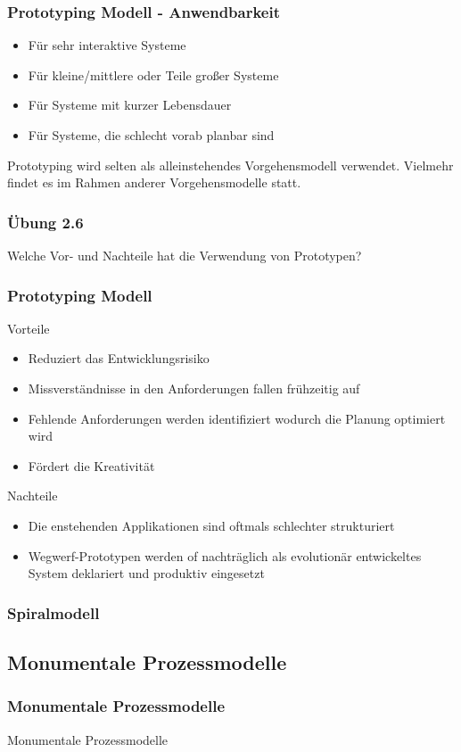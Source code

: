 \begin{frame}
\frametitle{Prototyping Modell - Anwendbarkeit}
	\begin{itemize}
		\item Für sehr interaktive Systeme
		\item Für kleine/mittlere oder Teile großer Systeme
		\item Für Systeme mit kurzer Lebensdauer
		\item Für Systeme, die schlecht vorab planbar sind
	\end{itemize}
	\bigskip
	Prototyping wird selten als alleinstehendes Vorgehensmodell verwendet.
	Vielmehr findet es im Rahmen anderer Vorgehensmodelle statt.
\end{frame}

\begin{frame}
\frametitle{Übung 2.6}
	Welche Vor- und Nachteile hat die Verwendung von Prototypen?
\end{frame}

\begin{frame}
\frametitle{Prototyping Modell}
	Vorteile
	\begin{itemize}
		\item Reduziert das Entwicklungsrisiko
		\item Missverständnisse in den Anforderungen fallen frühzeitig auf
		\item Fehlende Anforderungen werden identifiziert wodurch die Planung optimiert wird
		\item Fördert die Kreativität
	\end{itemize}
	\bigskip
	Nachteile
	\begin{itemize}
		\item Die enstehenden Applikationen sind oftmals schlechter strukturiert
		\item Wegwerf-Prototypen werden of nachträglich als evolutionär entwickeltes System deklariert 
		und produktiv eingesetzt
	\end{itemize}
\end{frame}

\begin{frame}
\frametitle{Spiralmodell}
	
\end{frame}

\subsection{Monumentale Prozessmodelle}
\begin{frame}
\frametitle{Monumentale Prozessmodelle}
\huge Monumentale Prozessmodelle
\end{frame}


